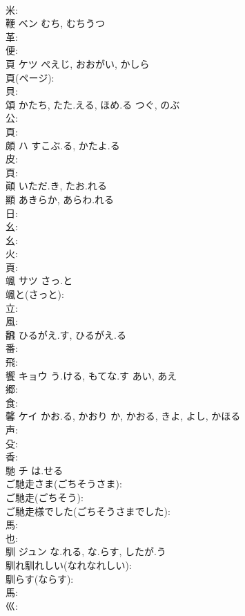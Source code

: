\documentclass[8pt]{extreport}
\begin{document}
\begin{CJK}{UTF8}{min}
\\	米: 
\\	鞭	ベン	むち, むちうつ		
\\	革: 
\\	便: 
\\	頁	ケツ	ぺえじ, おおがい, かしら		
\\	頁(ページ): 
\\	貝: 
\\	頌		かたち, たた.える, ほめ.る	つぐ, のぶ			
\\	公: 
\\	頁: 
\\	頗	ハ	すこぶ.る, かたよ.る		
\\	皮: 
\\	頁: 
\\	顚		いただ.き, たお.れる				
\\	顯		あきらか, あらわ.れる				
\\	日: 
\\	幺: 
\\	幺: 
\\	火: 
\\	頁: 
\\	颯	サツ	さっ.と		
\\	颯と(さっと): 
\\	立: 
\\	風: 
\\	飜		ひるがえ.す, ひるがえ.る				
\\	番: 
\\	飛: 
\\	饗	キョウ	う.ける, もてな.す	あい, あえ	
\\	郷: 
\\	食: 
\\	馨	ケイ	かお.る, かおり	か, かおる, きよ, よし, かほる	
\\	声: 
\\	殳: 
\\	香: 
\\	馳	チ	は.せる		
\\	ご馳走さま(ごちそうさま): 
\\	ご馳走(ごちそう): 
\\	ご馳走様でした(ごちそうさまでした): 
\\	馬: 
\\	也: 
\\	馴	ジュン	な.れる, な.らす, したが.う		
\\	馴れ馴れしい(なれなれしい): 
\\	馴らす(ならす): 
\\	馬: 
\\	巛: 

\end{CJK}
\end{document}
